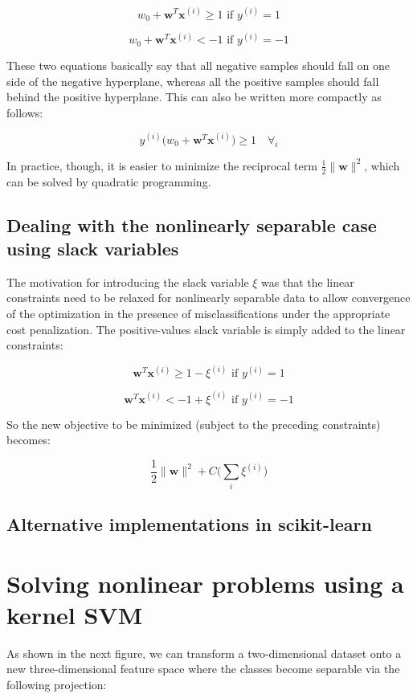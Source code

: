 \documentclass[letterpaper]{report}
\begin{document}
\[
w_0 + \mathbf{w}^T \mathbf{x}^{(i)} \ge 1 \text{ if } y^{(i)} = 1
\]

\[
w_0 + \mathbf{w}^T \mathbf{x}^{(i)}  < -1 \text{ if } y^{(i)} = -1
\]

These two equations basically say that all negative samples should fall on one side of the negative hyperplane, whereas all the positive samples should fall behind the positive hyperplane. This can also be written more compactly as follows:

\[
y^{(i)} \big(  w_0 + \mathbf{w}^T \mathbf{x}^{(i)} \big) \ge 1 \quad \forall_i
\]

In practice, though, it is easier to minimize the reciprocal term $\frac{1}{2} \lVert \mathbf{w} \rVert^2$, which can be solved by quadratic programming. 

\subsection{Dealing with the nonlinearly separable case using slack variables}

The motivation for introducing the slack variable $\xi$ was that the linear constraints need to be relaxed for nonlinearly separable data to allow convergence of the optimization in the presence of misclassifications under the appropriate cost penalization. The positive-values slack variable is simply added to the linear constraints:

\[
\mathbf{w}^T \mathbf{x}^{(i)} \ge 1 - \xi^{(i)} \text{ if } y^{(i)} = 1
\]

\[
\mathbf{w}^T \mathbf{x}^{(i)} < -1 + \xi^{(i)} \text{ if } y^{(i)} = -1
\]

So the new objective to be minimized (subject to the preceding constraints) becomes:

\[
\frac{1}{2} \lVert \mathbf{w} \rVert^2 + C \Big(\sum_i \xi^{(i)} \Big)
\]


\subsection{Alternative implementations in scikit-learn}
\section{Solving nonlinear problems using a kernel SVM}

As shown in the next  figure, we can transform a two-dimensional dataset onto a new three-dimensional feature space where the classes become separable via the following projection:
\end{document}
